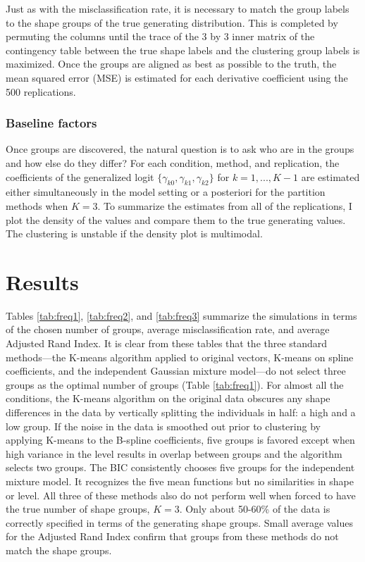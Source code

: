 Just as with the misclassification rate, it is necessary to match the group labels to the shape groups of the true generating distribution. This is completed by permuting the columns until the trace of the 3 by 3 inner matrix of the contingency table between the true shape labels and the clustering group labels is maximized. Once the groups are aligned as best as possible to the truth, the mean squared error (MSE) is estimated for each derivative coefficient using the 500 replications.

\subsubsection{Baseline factors}
Once groups are discovered, the natural question is to ask who are in the groups and how else do they differ? For each condition, method, and replication, the coefficients of the generalized logit $\{\gamma_{k0},\gamma_{k1},\gamma_{k2}\}$ for $k=1,...,K-1$ are estimated either simultaneously in the model setting or a posteriori for the partition methods when $K=3$. To summarize the estimates from all of the replications, I plot the density of the values and compare them to the true generating values. The clustering is unstable if the density plot is multimodal.

\section{Results}
Tables \ref{tab:freq1}, \ref{tab:freq2}, and \ref{tab:freq3} summarize the simulations in terms of the chosen number of groups, average misclassification rate, and average Adjusted Rand Index. It is clear from these tables that the three standard methods---the K-means algorithm applied to original vectors, K-means on spline coefficients, and the independent Gaussian mixture model---do not select three groups as the optimal number of groups (Table \ref{tab:freq1}). For almost all the conditions, the K-means algorithm on the original data obscures any shape differences in the data by vertically splitting the individuals in half: a high and a low group. If the noise in the data is smoothed out prior to clustering by applying K-means to the B-spline coefficients, five groups is favored except when high variance in the level results in overlap between groups and the algorithm selects two groups. The BIC consistently chooses five groups for the independent mixture model. It recognizes the five mean functions but no similarities in shape or level. All three of these methods also do not perform well when forced to have the true number of shape groups, $K=3$. Only about 50-60\% of the data is correctly specified in terms of the generating shape groups. Small average values for the Adjusted Rand Index confirm that groups from these methods do not match the shape groups.

